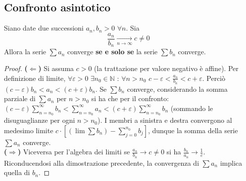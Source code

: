 \documentclass[10pt, oneside]{book}
\theoremstyle{plain}
\begin{document}
\subsection{Confronto asintotico}
\begin{ther}
Siano date due successioni $a_n, b_n > 0$ $\forall n$. Sia
\[\frac{a_n}{b_n} \xrightarrow[n \rightarrow \infty]{} c \neq 0\]
Allora la serie $\sum a_n$ converge \textbf{se e solo se} la serie $\sum b_n$ converge.
\end{ther}
\begin{proof}
\textbf{($\Leftarrow$)} Si assuma $c > 0$ (la trattazione per valore negativo è affine). Per definizione di limite, $\forall \varepsilon > 0$ $\exists n_0 \in \mathbb{N}$ : $\forall n > n_0$ $c - \varepsilon < \frac{a_n}{b_n} < c + \varepsilon$. Perciò $(c - \varepsilon) b_n < a_n < (c + \varepsilon) b_n$. Se $\sum b_n$ converge, considerando la somma parziale di $\sum a_n$ per $n > n_0$ si ha che per il confronto: $(c - \varepsilon) \sum_{n = n_0}^{\infty} b_n < \sum_{n = n_0}^{\infty} a_n < (c + \varepsilon) \sum_{n = n_0}^{\infty} b_n$ (sommando le disuguaglianze per ogni $n > n_0$). I membri a sinistra e destra convergono al medesimo limite $c \cdot [(\lim \sum b_n) - \sum_{j = 0}^{n_0} b_j ]$, dunque la somma della serie $\sum a_n$ converge.
\\\textbf{($\Rightarrow$)} Viceversa per l'algebra dei limiti se $\frac{a_n}{b_n} \rightarrow c \neq 0$ si ha $\frac{b_n}{a_n} \rightarrow \frac{1}{c}$. Riconducendosi alla dimostrazione precedente, la convergenza di $\sum a_n$ implica quella di $b_n$.
\end{proof}
\end{document}
